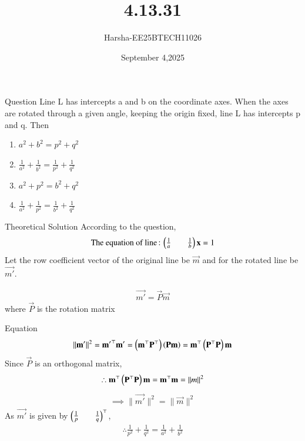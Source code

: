 \documentclass{beamer}
\title %
{4.13.31}
\date{September 4,2025}
\author %
{Harsha-EE25BTECH11026}
\begin{document}
\frame{\titlepage}


\begin{frame}{Question}
Line L has intercepts a and b on the coordinate axes. When the axes are rotated
through a given angle, keeping the origin fixed, line L has intercepts p and q. Then

\begin{enumerate}
    \item $a^2+b^2=p^2+q^2$
    \item $\frac{1}{a^2}+\frac{1}{b^2}=\frac{1}{p^2}+\frac{1}{q^2}$
    \item $a^2+p^2=b^2+q^2$
    \item $\frac{1}{a^2}+\frac{1}{p^2}=\frac{1}{b^2}+\frac{1}{q^2}$
\end{enumerate}

\end{frame}

\begin{frame}{Theoretical Solution}
According to the question,\\
\begin{align}
    \text{The equation of line\,:\,}\begin{pmatrix}\frac{1}{a}&&\frac{1}{b}\end{pmatrix}\mathbf{x}=1
\end{align} 
Let the row coefficient vector of the original line be $\vec{m}$ and for the rotated line be $\vec{m'}$.

\begin{align}
     \vec{m'}=\vec{P}\vec{m}       
\end{align}
where $\vec{P}$ is the rotation matrix
\end{frame}

\begin{frame}{Equation}
\begin{align}
    \|\mathbf{m'}\|^2=\mathbf{m'}^{\top}\mathbf{m'}=\left(\mathbf{m}^{\top}\mathbf{P}^{\top}\right)\left(\mathbf{P}\mathbf{m}\right)=\mathbf{m}^{\top}\left(\mathbf{P}^{\top}\mathbf{P}\right)\mathbf{m}
\end{align}
Since $\vec{P}$ is an orthogonal matrix,
\begin{align}
    \therefore \mathbf{m}^{\top}\left(\mathbf{P}^{\top}\mathbf{P}\right)\mathbf{m}=\mathbf{m}^{\top}\mathbf{m}=\|m\|^2
\end{align}
\begin{align}
    \implies \|\vec{m'}\|^2=\|\vec{m}\|^2
\end{align}
As $\vec{m'}$ is given by $\begin{pmatrix}\frac{1}{p}&&\frac{1}{q}\end{pmatrix}^{\top}$,
\begin{align}
    \therefore \frac{1}{p^2}+\frac{1}{q^2}=\frac{1}{a^2}+\frac{1}{b^2}
\end{align}

\end{frame}
\end{document}
